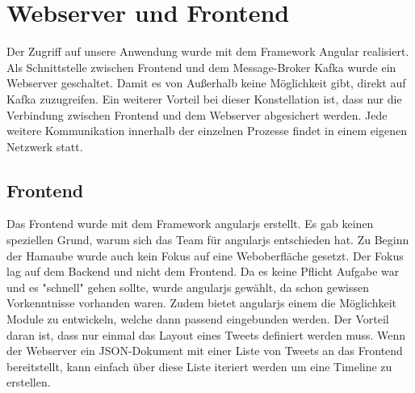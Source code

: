 \chapter{Webserver und Frontend}
Der Zugriff auf unsere Anwendung wurde mit dem Framework Angular realisiert. Als Schnittstelle zwischen Frontend und dem Message-Broker Kafka wurde ein Webserver geschaltet. Damit es von Außerhalb keine Möglichkeit gibt, direkt auf Kafka zuzugreifen. Ein weiterer Vorteil bei dieser Konstellation ist, dass nur die Verbindung zwischen Frontend und dem Webserver abgesichert werden. Jede weitere Kommunikation innerhalb der einzelnen Prozesse findet in einem eigenen Netzwerk statt.

\section{Frontend}
Das Frontend wurde mit dem Framework angularjs erstellt. Es gab keinen speziellen Grund, warum sich das Team für angularjs entschieden hat. Zu Beginn der Hamaube wurde auch kein Fokus auf eine Weboberfläche gesetzt. Der Fokus lag auf dem Backend und nicht dem Frontend. Da es keine Pflicht Aufgabe war und es "schnell" gehen sollte, wurde angularjs gewählt, da schon gewissen Vorkenntnisse vorhanden waren. Zudem bietet angularjs einem die Möglichkeit Module zu entwickeln, welche dann passend eingebunden werden. Der Vorteil daran ist, dass nur einmal das Layout eines Tweets definiert werden muss. Wenn der Webserver ein JSON-Dokument mit einer Liste von Tweets an das Frontend bereitstellt, kann einfach über diese Liste iteriert werden um eine Timeline zu erstellen. \\



	
	
	
